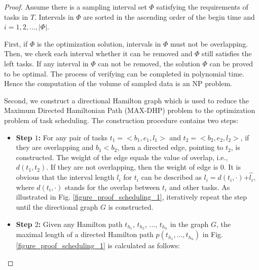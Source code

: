 \documentclass[prodmode,acmtosn]{acmsmall}
\begin{document}
\begin{proof}
Assume there is a sampling interval set $\Phi$ satisfying the requirements of tasks in $T$. Intervals in $\Phi$ are sorted in the ascending order of the begin time and $i\mathrm{=}1,2,...,|\Phi|$.

First, if $\Phi$ is the optimization solution, intervals in $\Phi$ must not be overlapping. Then, we check each interval whether it can be removed and   $\Phi$ still satisfies the left tasks. If any interval in $\Phi$ can not be removed, the solution $\Phi$ can be proved to be optimal. The process of verifying can be completed in polynomial time. Hence the  computation of the volume of sampled data is an NP problem.

Second, we construct a directional Hamilton graph which is used to reduce the Maximum Directed Hamiltonian Path (MAX-DHP) problem to the optimization problem of task scheduling. The construction procedure contains two steps:

\begin{itemize}
\item{\textbf{Step $1$: }}For any pair of tasks $t_1\mathrm{=<}b_1,e_1,l_1\mathrm{>}$ and $t_2\mathrm{=<}b_2,e_2,l_2\mathrm{>}$, if they are overlapping and $b_1\mathrm{<}b_2$, then a directed edge, pointing to $t_2$, is constructed. The weight of the edge equals the value of overlap, i.e., $d(t_1, t_2)$. If they are not overlapping, then the weight of edge is $0$. It is obvious that the interval length $l_i$ for $t_i$ can be described as $l_i \mathrm{=} d(t_i,\cdot)\mathrm{+}\widehat{l_i}$, where $d(t_i,\cdot)$ stands for the overlap between $t_i$ and other tasks. As illustrated in Fig. \ref{figure_proof_scheduling_1}, iteratively repeat the step until the directional graph $G$ is constructed.

\item{\textbf{Step $2$: }}Given any Hamilton path $t_{h_1}$, $t_{h_2}$, ..., $t_{h_n}$ in the graph $G$, the maximal length of a directed Hamilton path $p(t_{h_1}, ..., t_{h_n})$ in Fig. \ref{figure_proof_scheduling_1} is calculated as follows:


\end{itemize}
\end{proof}
\end{document}

